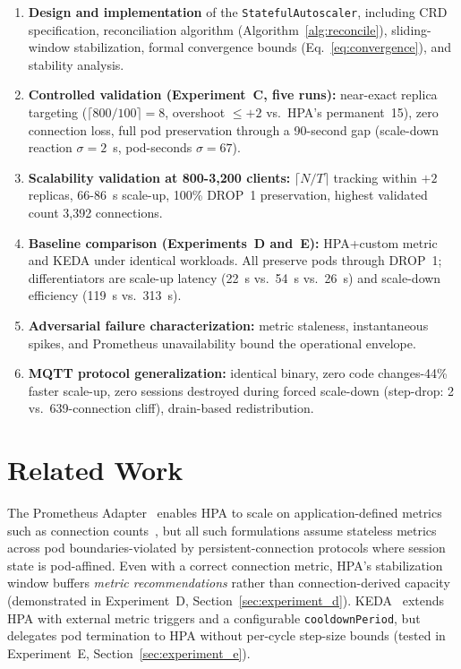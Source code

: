 \documentclass[3p,twocolumn]{elsarticle}
\theoremstyle{plain}%
\theoremstyle{definition}%
\begin{document}
\begin{enumerate}[leftmargin=*]
\item \textbf{Design and implementation} of the \texttt{StatefulAutoscaler}, including CRD specification, reconciliation algorithm (Algorithm~\ref{alg:reconcile}), sliding-window stabilization, formal convergence bounds (Eq.~\ref{eq:convergence}), and stability analysis.

\item \textbf{Controlled validation (Experiment~C, five runs):} near-exact replica targeting ($\lceil800/100\rceil = 8$, overshoot $\leq +2$ vs.\ HPA's permanent~15), zero connection loss, full pod preservation through a 90-second gap (scale-down reaction $\sigma = 2$~s, pod-seconds $\sigma = 67$).

\item \textbf{Scalability validation at 800-3{,}200 clients:} $\lceil N/T \rceil$ tracking within $+2$ replicas, 66-86~s scale-up, 100\% DROP~1 preservation, highest validated count 3{,}392 connections.

\item \textbf{Baseline comparison (Experiments~D and~E):} HPA+custom metric and KEDA under identical workloads. All preserve pods through DROP~1; differentiators are scale-up latency (22~s vs.\ 54~s vs.\ 26~s) and scale-down efficiency (119~s vs.\ 313~s).

\item \textbf{Adversarial failure characterization:} metric staleness, instantaneous spikes, and Prometheus unavailability bound the operational envelope.

\item \textbf{MQTT protocol generalization:} identical binary, zero code changes-44\% faster scale-up, zero sessions destroyed during forced scale-down (step-drop: 2 vs.\ 639-connection cliff), drain-based redistribution.
\end{enumerate}





\section{Related Work}
\label{sec:related}

The Prometheus Adapter~\cite{prometheus_adapter} enables HPA to scale on application-defined metrics such as connection counts~\cite{qu2018auto,rossi2020horizontal}, but all such formulations assume stateless metrics across pod boundaries-violated by persistent-connection protocols where session state is pod-affined. Even with a correct connection metric, HPA's stabilization window buffers \emph{metric recommendations} rather than connection-derived capacity (demonstrated in Experiment~D, Section~\ref{sec:experiment_d}). KEDA~\cite{keda_docs} extends HPA with external metric triggers and a configurable \texttt{cooldownPeriod}, but delegates pod termination to HPA without per-cycle step-size bounds (tested in Experiment~E, Section~\ref{sec:experiment_e}).
\end{document}
